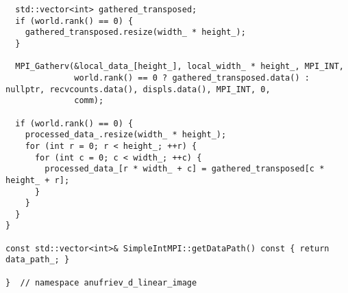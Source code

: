 \documentclass[12pt]{article}
\begin{document}
\begin{lstlisting}
  std::vector<int> gathered_transposed;
  if (world.rank() == 0) {
    gathered_transposed.resize(width_ * height_);
  }

  MPI_Gatherv(&local_data_[height_], local_width_ * height_, MPI_INT,
              world.rank() == 0 ? gathered_transposed.data() : nullptr, recvcounts.data(), displs.data(), MPI_INT, 0,
              comm);

  if (world.rank() == 0) {
    processed_data_.resize(width_ * height_);
    for (int r = 0; r < height_; ++r) {
      for (int c = 0; c < width_; ++c) {
        processed_data_[r * width_ + c] = gathered_transposed[c * height_ + r];
      }
    }
  }
}

const std::vector<int>& SimpleIntMPI::getDataPath() const { return data_path_; }

}  // namespace anufriev_d_linear_image
\end{lstlisting}
\end{document}

